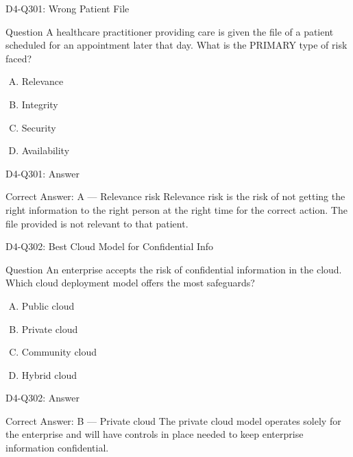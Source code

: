 \documentclass{beamer}
\begin{document}
	\begin{frame}{D4-Q301: Wrong Patient File}
		\begin{block}{Question}
			A healthcare practitioner providing care is given the file of a patient scheduled for an appointment later that day. What is the PRIMARY type of risk faced?
		\end{block}
		\begin{enumerate}[(A)]
			\item Relevance
			\item Integrity
			\item Security
			\item Availability
		\end{enumerate}
	\end{frame}
	\begin{frame}{D4-Q301: Answer}
		\begin{block}{Correct Answer: A --- Relevance risk}
			Relevance risk is the risk of not getting the right information to the right person at the right time for the correct action. The file provided is not relevant to that patient.
		\end{block}
	\end{frame}
	
	\begin{frame}{D4-Q302: Best Cloud Model for Confidential Info}
		\begin{block}{Question}
			An enterprise accepts the risk of confidential information in the cloud. Which cloud deployment model offers the most safeguards?
		\end{block}
		\begin{enumerate}[(A)]
			\item Public cloud
			\item Private cloud
			\item Community cloud
			\item Hybrid cloud
		\end{enumerate}
	\end{frame}
	\begin{frame}{D4-Q302: Answer}
		\begin{block}{Correct Answer: B --- Private cloud}
			The private cloud model operates solely for the enterprise and will have controls in place needed to keep enterprise information confidential.
		\end{block}
	\end{frame}
	
\end{document}

